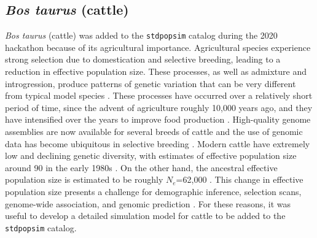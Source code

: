 \documentclass[hidelinks]{article}
\newcommand{\stdpopsim}{\texttt{stdpopsim}\xspace}
\begin{document}
\subsection*{\texorpdfstring{\emph{Bos taurus} (cattle)}{Bos taurus (cattle)}}
    \label{bos-taurus}

\emph{Bos taurus} (cattle) was added to the \stdpopsim catalog during the 2020 hackathon because of its agricultural importance. Agricultural species experience
strong selection due to domestication and selective breeding, leading
to a reduction in effective population size. These processes,
as well as admixture and introgression, produce patterns
of genetic variation that can be very different from typical model
species \citep{Larson2013}. These processes have occurred over a
relatively short period of time, since the advent of agriculture roughly 10,000 years ago, and they have intensified over the years to improve food production \citep{Gaut2018,MacLeod2013}. High-quality genome assemblies are now
available for several breeds of cattle \citep[e.g.,][]{Rosen2020, Heaton2021,
Talenti2022} and the use of genomic data has become ubiquitous
in selective breeding \citep{Meuwissen2001,MacLeod2014, Obsteter2021, Cesarani2022}.
Modern cattle have extremely low and declining genetic diversity,
with estimates of effective population size around 90 in the early 1980s \citep{MacLeod2013, VanRaden2020, Makanjouloa2020}.
On the other hand, the ancestral effective population size is estimated to be roughly $N_e$=62,000 \citep{MacLeod2013}.
This change in effective population size presents a challenge for demographic inference, 
selection scans, genome-wide association, and genomic prediction
\citep{MacLeod2013,MacLeod2014,Hartfield2022}. 
For these reasons, it was useful to develop a detailed simulation model for cattle to be added to the \stdpopsim catalog.
\end{document}
